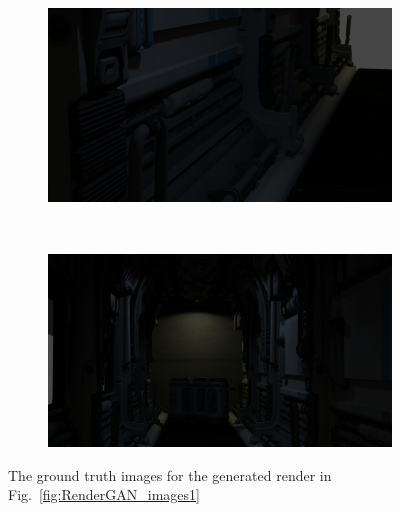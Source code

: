 \begin{figure}[h!]
    \centering
    \begin{subfigure}[b]{0.9\textwidth}
     \includegraphics[width=\textwidth]{figures/result/gt/s9_camera_9_cycles.png}
     \caption{}\label{subfig:1}
    \end{subfigure}
    \\ \vspace{0.2cm}
    \begin{subfigure}[b]{0.9\textwidth}
     \includegraphics[width=\textwidth]{figures/result/gt/s9_camera_80_cycles.png}
     \caption{}
    \end{subfigure}
    \caption[Cycles Render]{The ground truth images for the generated render in Fig.~\ref{fig:RenderGAN_images1}}
    \label{fig:gt_images1}
\end{figure}
